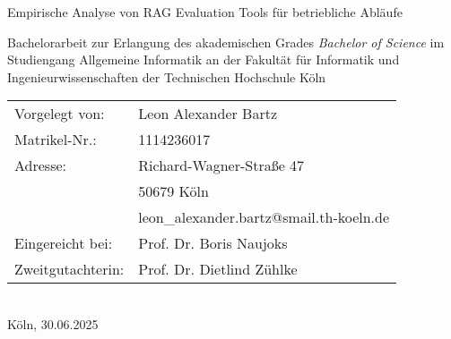 \begin{titlepage}
%
\sffamily%
%
\begin{center}
\end{center}
%
\vfill
%
\begin{huge}
Empirische Analyse von RAG Evaluation Tools für betriebliche Abläufe\\[10mm]
\end{huge}
%
Bachelorarbeit zur Erlangung des akademischen Grades\newline
\emph{Bachelor of Science}\newline
im Studiengang Allgemeine Informatik\newline
an der Fakultät für Informatik und Ingenieurwissenschaften\newline
der Technischen Hochschule Köln
%
\vfill
%
\begin{tabular}{@{}ll}
Vorgelegt von: & Leon Alexander Bartz\\
Matrikel-Nr.:  & 1114236017\\
Adresse:       & Richard-Wagner-Straße 47\\
               & 50679 Köln\\
               & leon\_alexander.bartz@smail.th-koeln.de\\[5mm]
Eingereicht bei:   & Prof. Dr. Boris Naujoks\\
Zweitgutachterin: & Prof. Dr. Dietlind Zühlke
\end{tabular}	
%
\\[10mm]
%
Köln, 30.06.2025%
%
\rmfamily%
%
\end{titlepage}